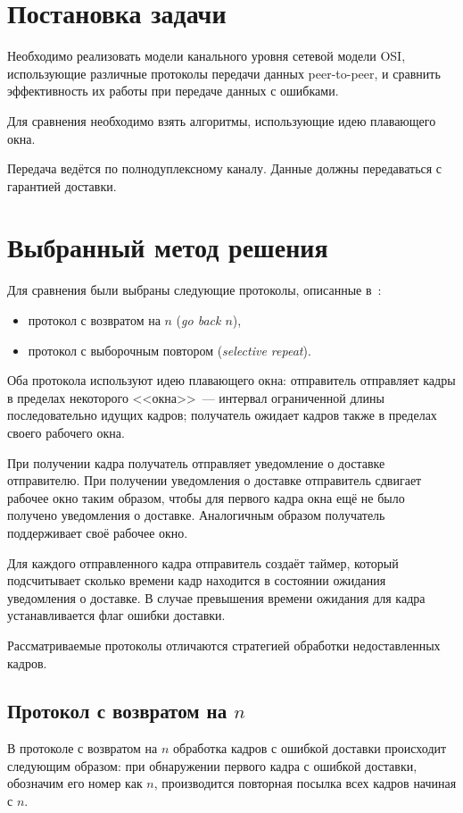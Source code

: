 \documentclass[a4paper,10pt]{article}
\begin{document}


\tableofcontents
\pagebreak


\section{Постановка задачи}
Необходимо реализовать модели канального уровня сетевой модели OSI, 
использующие различные протоколы передачи данных peer-to-peer, 
и сравнить эффективность их работы при передаче данных с ошибками.

Для сравнения необходимо взять алгоритмы, 
использующие идею плавающего окна.

Передача ведётся по полнодуплексному каналу.
Данные должны передаваться с гарантией доставки.

\section{Выбранный метод решения}
Для сравнения были выбраны следующие протоколы, описанные в~\cite{tanenbaum2003compnet}:
\begin{itemize}
  \item протокол с возвратом на $n$ (\textit{go back $n$}),
  \item протокол с выборочным повтором (\textit{selective repeat}).
\end{itemize}

Оба протокола используют идею плавающего окна:
отправитель отправляет кадры в пределах некоторого <<окна>>~--- 
интервал ограниченной длины последовательно идущих кадров;
получатель ожидает кадров также в пределах своего рабочего окна.

При получении кадра получатель отправляет уведомление о доставке 
отправителю.
При получении уведомления о доставке отправитель сдвигает рабочее окно
таким образом, чтобы для первого кадра окна ещё не было получено
уведомления о доставке.
Аналогичным образом получатель поддерживает своё рабочее окно.

Для каждого отправленного кадра отправитель создаёт таймер, 
который подсчитывает сколько времени кадр находится в состоянии ожидания
уведомления о доставке.
В случае превышения времени ожидания для кадра устанавливается флаг ошибки доставки.

Рассматриваемые протоколы отличаются стратегией обработки недоставленных кадров.

\subsection{Протокол с возвратом на $n$}
В протоколе с возвратом на $n$ обработка кадров с ошибкой доставки происходит следующим образом:
при обнаружении первого кадра с ошибкой доставки, обозначим его номер как $n$,
производится повторная посылка всех кадров начиная с $n$.
\end{document}
